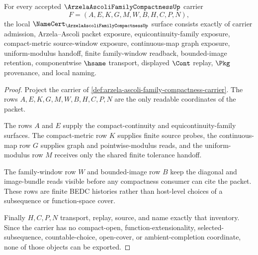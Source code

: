 \begin{theorem}
\label{thm:arzela-ascoli-family-compactness-namecert-obligations}
For every accepted $\ArzelaAscoliFamilyCompactnessUp$ carrier
$$
F=(A,E,K,G,M,W,B,H,C,P,N),
$$
the local $\NameCert_{\ArzelaAscoliFamilyCompactnessUp}$ surface consists exactly of carrier admission, Arzela--Ascoli packet exposure, equicontinuity-family exposure, compact-metric source-window exposure, continuous-map graph exposure, uniform-modulus handoff, finite family-window readback, bounded-image retention, componentwise $\hsame$ transport, displayed $\Cont$ replay, $\Pkg$ provenance, and local naming.
\end{theorem}
\begin{proof}
Project the carrier of \autoref{def:arzela-ascoli-family-compactness-carrier}. The rows $A,E,K,G,M,W,B,H,C,P,N$ are the only readable coordinates of the packet.

The rows $A$ and $E$ supply the compact-continuity and equicontinuity-family surfaces. The compact-metric row $K$ supplies finite source probes, the continuous-map row $G$ supplies graph and pointwise-modulus reads, and the uniform-modulus row $M$ receives only the shared finite tolerance handoff.

The family-window row $W$ and bounded-image row $B$ keep the diagonal and image-bundle reads visible before any compactness consumer can cite the packet. These rows are finite BEDC histories rather than host-level choices of a subsequence or function-space cover.

Finally $H,C,P,N$ transport, replay, source, and name exactly that inventory. Since the carrier has no compact-open, function-extensionality, selected-subsequence, countable-choice, open-cover, or ambient-completion coordinate, none of those objects can be exported.
\end{proof}


